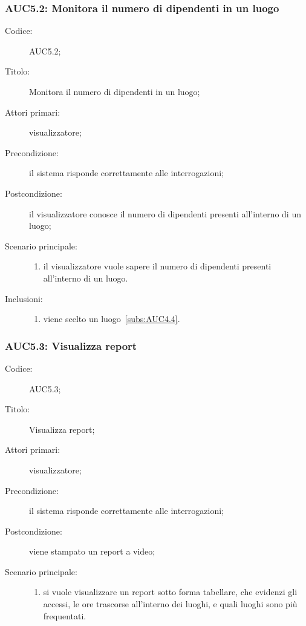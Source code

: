 \documentclass[../../../analisi-dei-requisiti.tex]{subfiles}
\begin{document}
\subsubsection{AUC5.2: Monitora il numero di dipendenti in un luogo}%
\label{subs:AUC5.2}
\begin{description}
  \item[Codice:] AUC5.2;
  \item[Titolo:] Monitora il numero di dipendenti in un luogo;
  \item[Attori primari:] visualizzatore;
  \item[Precondizione:] il sistema risponde correttamente alle interrogazioni;
  \item[Postcondizione:] il visualizzatore conosce il numero di dipendenti presenti all'interno di un luogo;
  \item[Scenario principale:]
  \begin{enumerate}
    \item il visualizzatore vuole sapere il numero di dipendenti presenti all'interno di un luogo.
  \end{enumerate}
  \item[Inclusioni:]
  \begin{enumerate}
    \item viene scelto un luogo~\ref{subs:AUC4.4}.
  \end{enumerate}
\end{description}


\subsubsection{AUC5.3: Visualizza report}%
\label{subs:AUC5.3}
\begin{description}
  \item[Codice:] AUC5.3;
  \item[Titolo:] Visualizza report;
  \item[Attori primari:] visualizzatore;
  \item[Precondizione:] il sistema risponde correttamente alle interrogazioni;
  \item[Postcondizione:] viene stampato un report a video;
  \item[Scenario principale:]
  \begin{enumerate}
    \item si vuole visualizzare un report sotto forma tabellare, che evidenzi gli accessi,
    le ore trascorse all'interno dei luoghi, e quali luoghi sono più frequentati.
  \end{enumerate}
\end{description}
\end{document}
